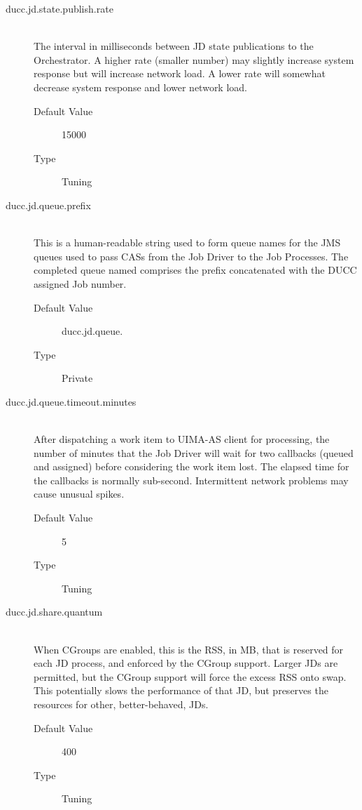 \begin{description}
        \item[ducc.jd.state.publish.rate] \hfill \\
          The interval in milliseconds between JD state publications to the Orchestrator.
          A higher rate (smaller number)
          may slightly increase system response but will increase network load. A lower rate will 
          somewhat decrease system response and lower network load. 
          \begin{description}
            \item[Default Value] 15000 
            \item[Type] Tuning 
          \end{description}

        \item[ducc.jd.queue.prefix] \hfill \\
          This is a human-readable string used to form queue names for the JMS
          queues used to pass CASs from the Job Driver to the Job Processes.
          The completed queue named comprises the prefix concatenated with the
          DUCC assigned Job number.
          \begin{description}
            \item[Default Value] ducc.jd.queue. 
            \item[Type] Private 
          \end{description}
          

        \item[ducc.jd.queue.timeout.minutes] \hfill \\
         After dispatching a work item to UIMA-AS client for processing, the
         number of minutes that the Job Driver will wait for two callbacks
         (queued and assigned) before considering the work item lost. The
         elapsed time for the callbacks is normally sub-second. Intermittent
         network problems may cause unusual spikes.
          \begin{description}
            \item[Default Value] 5
            \item[Type] Tuning 
          \end{description}


        \item[ducc.jd.share.quantum] \hfill \\
          When CGroups are enabled, this is the RSS, in MB, that is reserved for each JD process, and enforced
          by the CGroup support.  Larger JDs are permitted, but the CGroup support will force the excess
          RSS onto swap.  This potentially slows the performance of that JD, but preserves the resources
          for other, better-behaved, JDs.
          \begin{description}
            \item[Default Value] 400
            \item[Type] Tuning 
          \end{description}

      \end{description}
      
